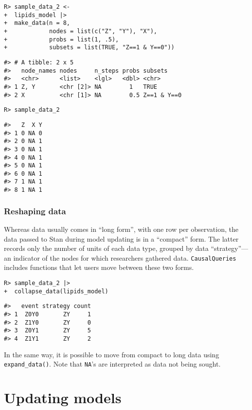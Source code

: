 \documentclass[
  11pt,
  article]{jss}
\begin{document}
\begin{verbatim}
R> sample_data_2 <-
+  lipids_model |>
+  make_data(n = 8,
+            nodes = list(c("Z", "Y"), "X"),
+            probs = list(1, .5),
+            subsets = list(TRUE, "Z==1 & Y==0"))
\end{verbatim}

\begin{verbatim}
#> # A tibble: 2 x 5
#>   node_names nodes     n_steps probs subsets    
#>   <chr>      <list>    <lgl>   <dbl> <chr>      
#> 1 Z, Y       <chr [2]> NA        1   TRUE       
#> 2 X          <chr [1]> NA        0.5 Z==1 & Y==0
\end{verbatim}

\begin{verbatim}
R> sample_data_2
\end{verbatim}

\begin{verbatim}
#>   Z  X Y
#> 1 0 NA 0
#> 2 0 NA 1
#> 3 0 NA 1
#> 4 0 NA 1
#> 5 0 NA 1
#> 6 0 NA 1
#> 7 1 NA 1
#> 8 1 NA 1
\end{verbatim}

\subsubsection{Reshaping data}\label{reshaping-data}

Whereas data usually comes in ``long form'', with one row per
observation, the data passed to Stan during model updating is in a
``compact'' form. The latter records only the number of units of each
data type, grouped by data ``strategy''---an indicator of the nodes for
which researchers gathered data. \texttt{CausalQueries} includes
functions that let users move between these two forms.

\begin{verbatim}
R> sample_data_2 |> 
+  collapse_data(lipids_model)
\end{verbatim}

\begin{verbatim}
#>   event strategy count
#> 1  Z0Y0       ZY     1
#> 2  Z1Y0       ZY     0
#> 3  Z0Y1       ZY     5
#> 4  Z1Y1       ZY     2
\end{verbatim}

In the same way, it is possible to move from compact to long data using
\texttt{expand\_data()}. Note that \texttt{NA}'s are interpreted as data
not being sought.

\section{Updating models}\label{sec-update}
\end{document}
